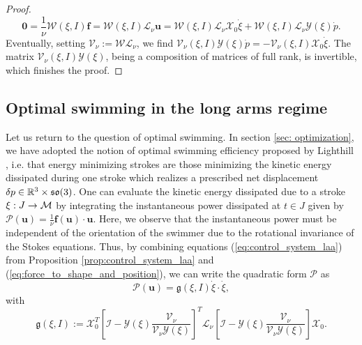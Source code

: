 \begin{proof}
\begin{equation}
\boldsymbol 0 = \frac{1}{\nu} \mathcal{W}(\xi, I) \boldsymbol f = \mathcal{W}(\xi, I) \mathcal{L}_{\nu} \boldsymbol u = \mathcal{W} (\xi, I) \mathcal{L}_{\nu} \mathcal{X}_0 \dot{\xi} + \mathcal{W}(\xi, I) \mathcal{L}_{\nu} \mathcal{Y}(\xi) \dot{p}.
\end{equation}
Eventually, setting $\mathcal{V}_{\nu} := \mathcal{W}  \mathcal{L}_{\nu}$, we find $\mathcal{V}_{\nu}(\xi, I) \mathcal{Y}(\xi) \dot{p} = - \mathcal{V}_{\nu}(\xi, I) \mathcal{X}_0 \dot{\xi}$. The matrix $\mathcal{V}_{\nu}(\xi, I) \mathcal{Y}(\xi)$, being a composition of matrices of full rank, is invertible, which finishes the proof.
\end{proof}

\subsection{Optimal swimming in the long arms regime}
Let us return to the question of optimal swimming. In section \ref{sec: optimization}, we have adopted the notion of optimal swimming efficiency proposed by Lighthill \cite{Lighthill1952}, i.e. that energy minimizing strokes are those minimizing the kinetic energy dissipated during one stroke which realizes a prescribed net displacement $\delta p \in \mathbb{R}^3 \times \mathfrak{so}(3)$. One can evaluate the kinetic energy dissipated due to a stroke $\xi: J \to \mathcal{M}$ by integrating the instantaneous power dissipated at $t \in J$ given by $\mathcal{P}(\boldsymbol u) = \frac{1}{\nu} \boldsymbol f(\boldsymbol u) \cdot \boldsymbol u$. Here, we observe that the instantaneous power must be independent of the orientation of the swimmer due to the rotational invariance of the Stokes equations. Thus, by combining equations (\ref{eq:control_system_laa}) from Proposition \ref{prop:control_system_laa} and (\ref{eq:force_to_shape_and_position}), we can write the quadratic form $\mathcal{P}$ as
\begin{equation}
\mathcal{P}(\boldsymbol u) = \mathfrak{g}(\xi, I) \dot{\xi} \cdot \dot{\xi},
\end{equation}
with
\begin{equation}
\label{eq:energy_matrix_laa}
\mathfrak{g}(\xi, I) := \mathcal{X}_0^T \left  [ \mathcal{I} - \mathcal{Y}(\xi)\frac{\mathcal{V}_{\nu}}{\mathcal{V}_{\nu} \mathcal{Y}(\xi)} \right ]^T \mathcal{L}_{\nu} \left  [ \mathcal{I} - \mathcal{Y}(\xi)\frac{\mathcal{V}_{\nu}}{\mathcal{V}_{\nu} \mathcal{Y}(\xi)} \right ] \mathcal{X}_0.
\end{equation}
